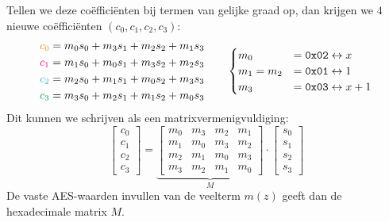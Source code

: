 Tellen we deze coëfficiënten bij termen van gelijke graad op, dan krijgen we $4$ nieuwe coëfficiënten $(c_0, c_1, c_2, c_3)$:
\begin{equation*}
    \begin{aligned}
        \textcolor{BurntOrange}{c_0} &= m_0s_0 + m_3s_1 + m_2s_2 + m_1s_3 \\
        \textcolor{RubineRed}{c_1} &= m_1s_0 + m_0s_1 + m_3s_2 + m_2s_3 \\
        \textcolor{Aquamarine}{c_2} &= m_2s_0 + m_1s_1 + m_0s_2 + m_3s_3 \\
        \textcolor{Green}{c_3} &= m_3s_0 + m_2s_1 + m_1s_2 + m_0s_3
    \end{aligned} \qquad \begin{cases}
        m_0 &= \mathtt{0x02} \leftrightarrow x \\
        m_1 = m_2 &= \mathtt{0x01} \leftrightarrow 1 \\
        m_3 &= \mathtt{0x03} \leftrightarrow x + 1
    \end{cases}
\end{equation*}
Dit kunnen we schrijven als een matrixvermenigvuldiging:
\begin{equation*}
    \begin{bmatrix}
        c_0 \\ c_1 \\ c_2 \\ c_3
    \end{bmatrix} = \underbrace{\begin{bmatrix}
        m_0 & m_3 & m_2 & m_1 \\
        m_1 & m_0 & m_3 & m_2 \\
        m_2 & m_1 & m_0 & m_3 \\
        m_3 & m_2 & m_1 & m_0
    \end{bmatrix}}_M \cdot \begin{bmatrix}
        s_0 \\ s_1 \\ s_2 \\ s_3
    \end{bmatrix}
\end{equation*}
De vaste AES-waarden invullen van de veelterm $m(z)$ geeft dan de hexadecimale matrix $M$.

\begin{center}
\resizebox{0.8\textwidth}{!}{%
    
}
\end{center}



